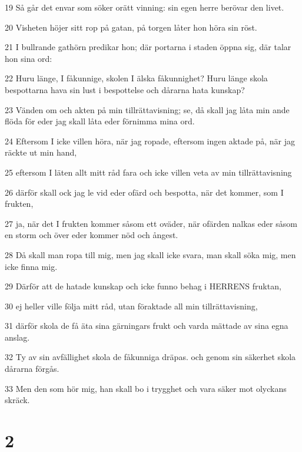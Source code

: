 \par 19 Så går det envar som söker orätt vinning: sin egen herre berövar den livet.
\par 20 Visheten höjer sitt rop på gatan, på torgen låter hon höra sin röst.
\par 21 I bullrande gathörn predikar hon; där portarna i staden öppna sig, där talar hon sina ord:
\par 22 Huru länge, I fåkunnige, skolen I älska fåkunnighet? Huru länge skola bespottarna hava sin lust i bespottelse och dårarna hata kunskap?
\par 23 Vänden om och akten på min tillrättavisning; se, då skall jag låta min ande flöda för eder jag skall låta eder förnimma mina ord.
\par 24 Eftersom I icke villen höra, när jag ropade, eftersom ingen aktade på, när jag räckte ut min hand,
\par 25 eftersom I läten allt mitt råd fara och icke villen veta av min tillrättavisning
\par 26 därför skall ock jag le vid eder ofärd och bespotta, när det kommer, som I frukten,
\par 27 ja, när det I frukten kommer såsom ett oväder, när ofärden nalkas eder såsom en storm och över eder kommer nöd och ångest.
\par 28 Då skall man ropa till mig, men jag skall icke svara, man skall söka mig, men icke finna mig.
\par 29 Därför att de hatade kunskap och icke funno behag i HERRENS fruktan,
\par 30 ej heller ville följa mitt råd, utan föraktade all min tillrättavisning,
\par 31 därför skola de få äta sina gärningars frukt och varda mättade av sina egna anslag.
\par 32 Ty av sin avfällighet skola de fåkunniga dräpas. och genom sin säkerhet skola dårarna förgås.
\par 33 Men den som hör mig, han skall bo i trygghet och vara säker mot olyckans skräck.

\chapter{2}

